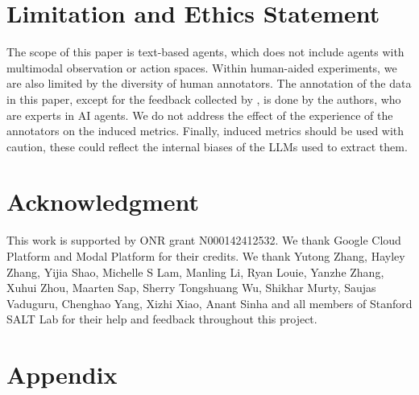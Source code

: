 \documentclass{article} %
\begin{document}
\section*{Limitation and Ethics Statement}
The scope of this paper is text-based agents, which does not include agents with multimodal observation or action spaces. Within human-aided experiments, we are also limited by the diversity of human annotators. The annotation of the data in this paper, except for the feedback collected by \citet{shao2024collaborative}, is done by the authors, who are experts in AI agents. We do not address the effect of the experience of the annotators on the induced metrics. Finally, induced metrics should be used with caution, these could reflect the internal biases of the LLMs used to extract them. 

\section*{Acknowledgment}
This work is supported by ONR grant N000142412532. We thank Google Cloud Platform and Modal Platform for their credits.
We thank Yutong Zhang, Hayley Zhang, Yijia Shao, Michelle S Lam, Manling Li, Ryan Louie, Yanzhe Zhang, Xuhui Zhou, Maarten Sap, Sherry Tongshuang Wu, Shikhar Murty, Saujas Vaduguru, Chenghao Yang, Xizhi Xiao, Anant Sinha and all members of Stanford SALT Lab for their help and feedback throughout this project. 





\newpage
\appendix
\section*{Appendix}

\end{document}
